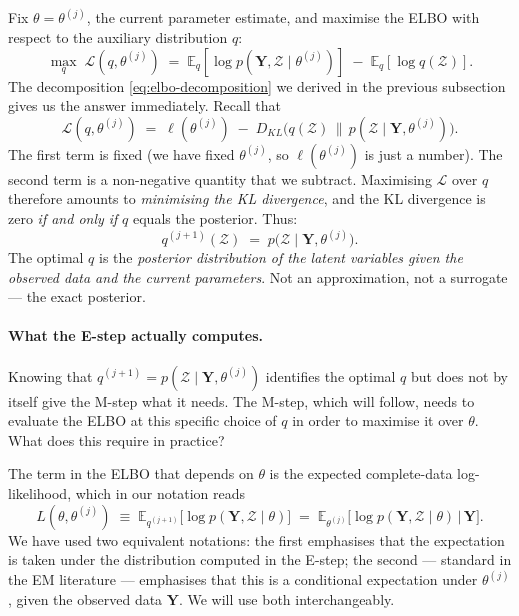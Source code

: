 \documentclass[11pt, a4paper, oneside]{article}
\newcommand{\mY}{\mathbf{Y}}
\begin{document}
Fix $\theta = \theta^{(j)}$, the current parameter estimate, and
maximise the ELBO with respect to the auxiliary distribution $q$:
\[
\max_q\;\mathcal{L}(q, \theta^{(j)})
\;=\; \mathbb{E}_q[\log p(\mY, \mathcal{Z} \mid \theta^{(j)})]
\;-\; \mathbb{E}_q[\log q(\mathcal{Z})].
\]
The decomposition \eqref{eq:elbo-decomposition} we derived in the
previous subsection gives us the answer immediately. Recall that
\[
\mathcal{L}(q, \theta^{(j)}) \;=\; \ell(\theta^{(j)})
\;-\; D_{KL}\!\big(q(\mathcal{Z})\,\|\,p(\mathcal{Z} \mid \mY, \theta^{(j)})\big).
\]
The first term is fixed (we have fixed $\theta^{(j)}$, so
$\ell(\theta^{(j)})$ is just a number). The second term is a non-negative
quantity that we subtract. Maximising $\mathcal{L}$ over $q$ therefore
amounts to \emph{minimising the KL divergence}, and the KL divergence is
zero \emph{if and only if} $q$ equals the posterior. Thus:
\begin{equation}
\boxed{\;\;q^{(j+1)}(\mathcal{Z}) \;=\; p\big(\mathcal{Z} \mid \mY, \theta^{(j)}\big).\;\;}
\label{eq:e-step-optimal-q}
\end{equation}
The optimal $q$ is the \emph{posterior distribution of the latent
variables given the observed data and the current parameters}. Not an
approximation, not a surrogate — the exact posterior.

\paragraph{What the E-step actually computes.}
Knowing that $q^{(j+1)} = p(\mathcal{Z} \mid \mY, \theta^{(j)})$
identifies the optimal $q$ but does not by itself give the M-step what
it needs.
The M-step, which will follow, needs to evaluate the ELBO
at this specific choice of $q$ in order to maximise it over $\theta$.
What does this require in practice?

The term in the ELBO that depends on $\theta$ is the expected
complete-data log-likelihood, which in our notation reads
\begin{equation}
L(\theta, \theta^{(j)}) \;\equiv\; \mathbb{E}_{q^{(j+1)}}\!\big[\log p(\mY, \mathcal{Z} \mid \theta)\big]
\;=\; \mathbb{E}_{\theta^{(j)}}\!\big[\log p(\mY, \mathcal{Z} \mid \theta) \,\big|\, \mY\big].
\label{eq:Q-function}
\end{equation}
We have used two equivalent notations: the first emphasises that the
expectation is taken under the distribution computed in the E-step; the
second — standard in the EM literature — emphasises that this is a
conditional expectation under $\theta^{(j)}$, given the observed data
$\mY$. We will use both interchangeably.
\end{document}
